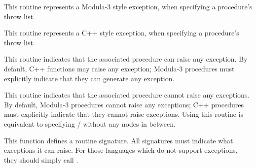 \begin{functionality}
This routine represents a Modula-3 style exception, when specifying a
procedure's throw list.
\end{functionality}
\begin{functionality}
This routine represents a C++ style exception, when specifying a
procedure's throw list.
\end{functionality}
\begin{functionality}
This routine indicates that the associated procedure can raise any
exception.  By default, C++ functions may raise any exception;
Modula-3 procedures must explicitly indicate that they can generate
any exception.
\end{functionality}
\begin{functionality}
This routine indicates that the associated procedure cannot raise any
exceptions.  By default, Modula-3 procedures cannot raise any exceptions;
C++ procedures must explicitly indicate that they cannot raise
exceptions.  Using this routine is equivalent to specifying
/ without any 
nodes in between.
\end{functionality}
\begin{functionality}
\end{functionality}

\begin{functionality}	
This function defines a routine signature.  All signatures must
indicate what exceptions it can raise.  For those languages which do
not support exceptions, they should simply call .
\end{functionality}	



